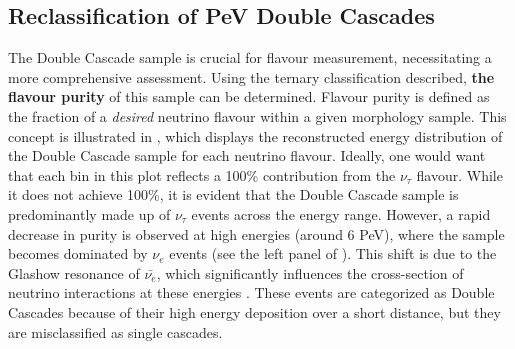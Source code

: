 
\subsection{Reclassification of PeV Double Cascades}
\label{sec:Pev_mask}
The Double Cascade sample is crucial for flavour measurement, necessitating a more comprehensive assessment. Using the ternary classification described, \textbf{the flavour purity} of this sample can be determined. Flavour purity is defined as the fraction of a \emph{desired} neutrino flavour within a given morphology sample. This concept is illustrated in , which displays the reconstructed energy distribution of the Double Cascade sample for each neutrino flavour. Ideally, one would want that each bin in this plot reflects a 100\% contribution from the \(\nu_{\tau}\) flavour. While it does not achieve 100\%, it is evident that the Double Cascade sample is predominantly made up of \(\nu_{\tau}\) events across the energy range. However, a rapid decrease in purity is observed at high energies (around 6 PeV), where the sample becomes dominated by \(\nu_e\) events (see the left panel of ). This shift is due to the Glashow resonance of \(\bar{\nu_e}\), which significantly influences the cross-section of neutrino interactions at these energies . These events are categorized as Double Cascades because of their high energy deposition over a short distance, but they are misclassified as single cascades.

